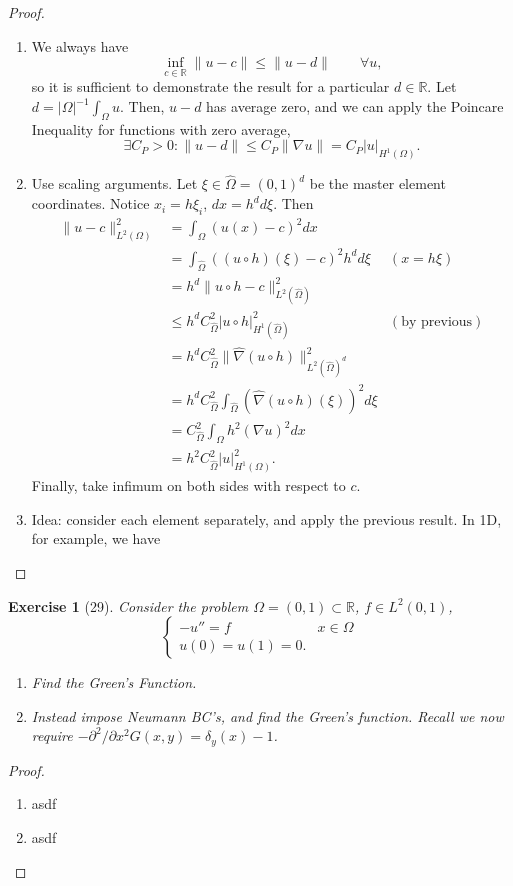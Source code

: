 \documentclass[letterpaper,twoside,11pt]{article}
\theoremstyle{mystyle}
\newtheorem*{exercise}{Exercise}
\newcommand{\R}{{\mathbb R}}
\newcommand{\cbk}{\color{black}}
\newcommand{\cblu}{\color{blue}}
\newcommand{\inv}{^{-1}}
\newcommand{\Hone}{H^1\left( \Omega \right)}
\begin{document}
\cblu 
\begin{proof}
  \begin{enumerate}
    \item We always have 
    \[\inf_{c\in \R} \|u-c\| \leq \| u - d \| \qquad \forall u, \]
    so it is sufficient to demonstrate the result for a particular $d\in \R$. Let $d = |\Omega|\inv \int_\Omega u$. Then, $u-d$ has average zero, and we can apply the Poincare Inequality for functions with zero average, 
    \[\exists C_P>0 : \|u-d\| \leq C_P \|\nabla u\| = C_P |u|_{\Hone}.\]
    \item Use scaling arguments. Let $\xi\in \hat \Omega = \left( 0,1 \right)^d$ be the master element coordinates. Notice $x_i = h\xi_i$, $dx = h^d d\xi$. Then 
    \begin{align*}
      \|u-c\|^2_{L^2(\Omega)} &= \int_\Omega (u(x)-c)^2 dx \\[.2cm] 
      &= \int_{\hat \Omega} \left( (u\circ h)(\xi) - c \right)^2 h^d d\xi &  (x = h \xi)  \\[.2cm]
      &= h^d\|u \circ h - c \|^2_{L^2 (\hat \Omega)} \\[.2cm] 
      &\leq h^dC_{\hat\Omega}^2 |u\circ h|^2_{H^1(\hat\Omega)} & (\text{by previous})\\[.2cm] 
      &= h^dC_{\hat\Omega}^2 \|\hat \nabla (u\circ h) \|^2_{L^2(\hat \Omega)^d} \\[.2cm]
      &= h^dC_{\hat\Omega}^2 \int_{\hat\Omega} (\hat \nabla (u \circ h) (\xi))^2 d\xi \\[.2cm]
      &= C_{\hat\Omega}^2 \int_\Omega h^2 \left( \nabla u \right)^2 dx \\[.2cm]
      &= h^2 C_{\hat\Omega}^2 |u|^2_{\Hone}.
    \end{align*}
    Finally, take infimum on both sides with respect to $c$. 
    \item Idea: consider each element separately, and apply the previous result. In 1D, for example, we have 
  \end{enumerate}
\end{proof}
\cbk 











\newpage 
\begin{exercise}[29]
  Consider the problem 
  $\Omega= \left( 0,1 \right)\subset \R$, $f\in L^2 \left( 0,1 \right)$, 
  \[\left\{ {\begin{array}{*{20}{l}}
    -u'' = f & x \in \Omega \\[.2cm]
    u(0) = u(1) = 0.
  \end{array}} \right.\]
  \begin{enumerate}
    \item Find the Green's Function. 
    \item Instead impose Neumann BC's, and find the Green's function. Recall we now require \(-\partial^2/\partial x^2 G(x, y) = \delta_y(x) -1\).
  \end{enumerate}
\end{exercise}

\cblu
\begin{proof}
  \begin{enumerate}
    \item asdf 
    \item asdf
  \end{enumerate}
\end{proof}
\cbk 
\end{document}
